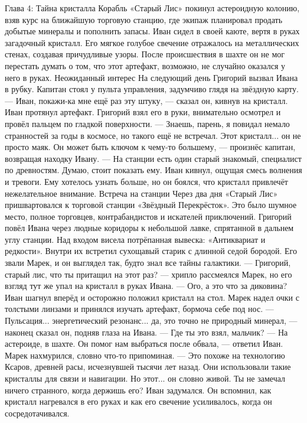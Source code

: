 \documentclass[12pt,a4paper]{book}
\begin{document}
Глава 4: Тайна кристалла
Корабль «Старый Лис» покинул астероидную колонию, взяв курс на ближайшую торговую станцию, где экипаж планировал продать добытые минералы и пополнить запасы. Иван сидел в своей каюте, вертя в руках загадочный кристалл. Его мягкое голубое свечение отражалось на металлических стенах, создавая причудливые узоры. После происшествия в шахте он не мог перестать думать о том, что этот артефакт, возможно, не случайно оказался у него в руках.
Неожиданный интерес
На следующий день Григорий вызвал Ивана в рубку. Капитан стоял у пульта управления, задумчиво глядя на звёздную карту.
— Иван, покажи-ка мне ещё раз эту штуку, — сказал он, кивнув на кристалл.
Иван протянул артефакт. Григорий взял его в руки, внимательно осмотрел и провёл пальцем по гладкой поверхности.
— Знаешь, парень, я повидал немало странностей за годы в космосе, но такого ещё не встречал. Этот кристалл... он не просто маяк. Он может быть ключом к чему-то большему, — произнёс капитан, возвращая находку Ивану. — На станции есть один старый знакомый, специалист по древностям. Думаю, стоит показать ему.
Иван кивнул, ощущая смесь волнения и тревоги. Ему хотелось узнать больше, но он боялся, что кристалл привлечёт нежелательное внимание.
Встреча на станции
Через два дня «Старый Лис» пришвартовался к торговой станции «Звёздный Перекрёсток». Это было шумное место, полное торговцев, контрабандистов и искателей приключений. Григорий повёл Ивана через людные коридоры к небольшой лавке, спрятанной в дальнем углу станции. Над входом висела потрёпанная вывеска: «Антиквариат и редкости».
Внутри их встретил сухощавый старик с длинной седой бородой. Его звали Марек, и он выглядел так, будто знал все тайны галактики.
— Григорий, старый лис, что ты притащил на этот раз? — хрипло рассмеялся Марек, но его взгляд тут же упал на кристалл в руках Ивана. — Ого, а это что за диковина?
Иван шагнул вперёд и осторожно положил кристалл на стол. Марек надел очки с толстыми линзами и принялся изучать артефакт, бормоча себе под нос.
— Пульсация... энергетический резонанс... да, это точно не природный минерал, — наконец сказал он, подняв глаза на Ивана. — Где ты это взял, мальчик?
— На астероиде, в шахте. Он помог нам выбраться после обвала, — ответил Иван.
Марек нахмурился, словно что-то припоминая.
— Это похоже на технологию Ксаров, древней расы, исчезнувшей тысячи лет назад. Они использовали такие кристаллы для связи и навигации. Но этот... он словно живой. Ты не замечал ничего странного, когда держишь его?
Иван задумался. Он вспомнил, как кристалл нагревался в его руках и как его свечение усиливалось, когда он сосредотачивался.
\end{document}
